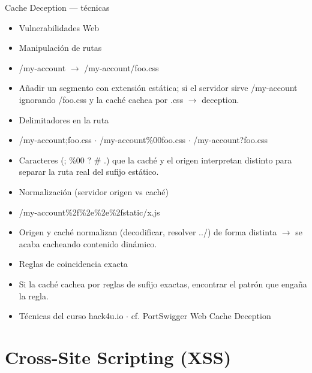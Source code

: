 \documentclass[aspectratio=169,10pt]{beamer}
\begin{document}
\begin{frame}[allowframebreaks]{Cache Deception --- técnicas}
\small
  \begin{itemize}
  \item Vulnerabilidades Web
  \item Manipulación de rutas
  \item /my-account $\rightarrow$ /my-account/foo.css
  \item Añadir un segmento con extensión estática; si el servidor sirve /my-account ignorando /foo.css y la caché cachea por .css $\rightarrow$ deception.
  \item Delimitadores en la ruta
  \item /my-account;foo.css $\cdot$ /my-account\%00foo.css $\cdot$ /my-account?foo.css
  \item Caracteres (; \%00 ? \# .) que la caché y el origen interpretan distinto para separar la ruta real del sufijo estático.
  \item Normalización (servidor origen vs caché)
  \item /my-account\%2f\%2e\%2e\%2fstatic/x.js
  \item Origen y caché normalizan (decodificar, resolver ../) de forma distinta $\rightarrow$ se acaba cacheando contenido dinámico.
  \item Reglas de coincidencia exacta
  \item Si la caché cachea por reglas de sufijo exactas, encontrar el patrón que engaña la regla.
  \item Técnicas del curso hack4u.io $\cdot$ cf. PortSwigger Web Cache Deception
  \end{itemize}
\end{frame}

\section{Cross-Site Scripting (XSS)}
\end{document}
